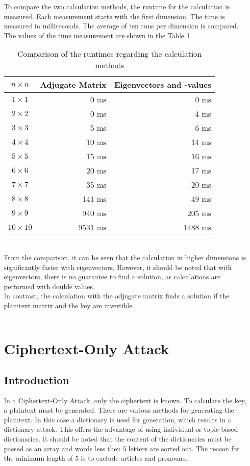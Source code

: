 \documentclass[conference]{IEEEtran}
\begin{document}
To compare the two calculation methods, the runtime for the calculation is measured. Each measurement starts with the first dimension. The time is measured in milliseconds. The average of ten runs per dimension is compared. The values of the time measurement are shown in the Table \ref{tab:runtime_table}.
\\
\begin{table}[h!]
\centering
\caption{Comparison of the runtimes regarding the calculation methods}
\label{tab:runtime_table}
\begin{tabular}{|c|r|r|}
\hline
 \textbf{\( n \times n \)}& \textbf{Adjugate Matrix} & \textbf{Eigenvectors and -values} \\
\hline
 \( 1 \times 1 \)& 0 ms & 0 ms\\
\( 2 \times 2 \)& 0 ms & 4 ms\\
\( 3 \times 3 \)& 5 ms & 6 ms\\
\( 4 \times 4 \)& 10 ms & 14 ms\\
\( 5 \times 5 \)& 15 ms & 16 ms\\
\( 6 \times 6 \)& 20 ms & 17 ms\\
\( 7 \times 7 \)& 35 ms & 20 ms\\
\( 8 \times 8 \)& 141 ms & 49 ms\\
\( 9 \times 9\)& 940 ms & 205 ms\\
\( 10 \times 10 \)& 9531 ms & 1488 ms\\
\hline
\end{tabular}
\end{table}
\\
From the comparison, it can be seen that the calculation in higher dimensions is significantly faster with eigenvectors. However, it should be noted that with eigenvectors, there is no guarantee to find a solution, as calculations are performed with double values.
\\
In contrast, the calculation with the adjugate matrix finds a solution if the plaintext matrix and the key are invertible.
\\\\

\section{Ciphertext-Only Attack}
\subsection{Introduction}
In a Ciphertext-Only Attack, only the ciphertext is known. To calculate the key, a plaintext must be generated. There are various methods for generating the plaintext. In this case a dictionary is used for generation, which results in a dictionary attack. This offers the advantage of using individual or topic-based dictionaries. It should be noted that the content of the dictionaries must be passed as an array and words less then 5 letters are sorted out. The reason for the minimum length of 5 is to exclude articles and pronouns.
\end{document}
